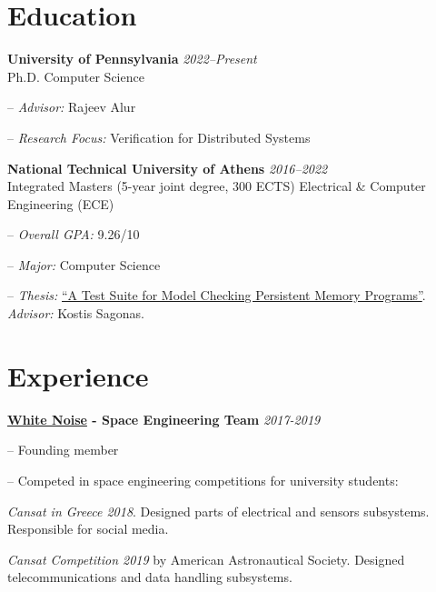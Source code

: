 \documentclass[margin]{res}
\newcommand{\field}[2]{\noindent \textbf{#1} \hfill #2 \\}
\begin{document}
\begin{resume}

\section{Education}

\field{University of Pennsylvania}  {\emph{2022--Present}} 
Ph.D. Computer Science
\begin{compactitem}
\item[--] \emph{Advisor:} Rajeev Alur
\item[--] \emph{Research Focus:} Verification for Distributed Systems
\end{compactitem}
 
\field{National Technical University of Athens}  {\emph{2016--2022}} 
Integrated Masters (5-year joint degree, 300 ECTS) Electrical \& Computer Engineering (ECE)
\begin{compactitem}
\item[--] \emph{Overall GPA:} 9.26/10 
\item[--] \emph{Major:} Computer Science 
\item[--] \emph{Thesis:} \href{http://artemis.cslab.ece.ntua.gr:8080/jspui/bitstream/123456789/18415/1/thesis.pdf}{``A Test Suite for Model Checking Persistent Memory Programs''}. \emph{Advisor:} Kostis Sagonas.
\end{compactitem} 

\section{Experience}

\textbf{\href{https://whitenoise.gr/}{White Noise} - Space Engineering Team} \hfill \emph{2017-2019}
\begin{compactitem}
\item[--] Founding member
\item[--] Competed in space engineering competitions for university students:
\begin{compactitem}
\item \textit{Cansat in Greece 2018}. 
  Designed parts of electrical and sensors subsystems. 
  Responsible for social media.
\item \textit{Cansat Competition 2019} by American Astronautical Society. 
  Designed telecommunications and data handling subsystems.
\end{compactitem}
\end{compactitem}


\end{resume}
\end{document}
